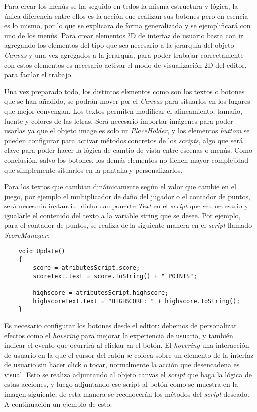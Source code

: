 Para crear los menús se ha seguido en todos la misma estructura y lógica, la única diferencia entre ellos es la acción que realizan sus botones pero en esencia es lo mismo, por lo que se explicara de forma generalizada y se ejemplificará con uno de los menús. Para crear elementos 2D de interfaz de usuario basta con ir agregando los elementos del tipo que sea necesario a la jerarquía del objeto \textit{Canvas} y una vez agregados a la jerarquía, para poder trabajar correctamente con estos elementos es necesario activar el modo de visualización 2D del editor, para facilar el trabajo. 

Una vez preparado todo, los distintos elementos como son los textos o botones que se han añadido, se podrán mover por el \textit{Canvas} para situarlos en los lugares que mejor convengan. Los textos permiten modificar el alineamiento, tamaño, fuente y colores de las letras. Será necesario importar imágenes para poder usarlas ya que el objeto image es solo un \textit{PlaceHolder}, y los elementos \textit{buttom} se pueden configurar para activar métodos concretos de los \textit{scripts}, algo que será clave para poder hacer la lógica de cambio de vista entre escenas o menús. Como conclusión, salvo los botones, los demás elementos no tienen mayor complejidad que simplemente situarlos en la pantalla y personalizarlos.

Para los textos que cambian dinámicamente según el valor que cambie en el juego, por ejemplo el multiplicador de daño del jugador o el contador de puntos, será necesario instanciar dicho componente \textit{Text} en el \textit{script} que sea necesario y igualarle el contenido del texto a la variable string que se desee. Por ejemplo, para el contador de puntos, se realiza de la siguiente manera en el \textit{script} llamado \textit{ScoreManager}:


\begin{lstlisting}
    void Update()
    {
        score = atributesScript.score;
        scoreText.text = score.ToString() + " POINTS";

        highscore = atributesScript.highscore;
        highscoreText.text = "HIGHSCORE: " + highscore.ToString();
    }
\end{lstlisting}

Es necesario configurar los botones desde el editor: debemos de personalizar efectos como el \textit{hovering} para mejorar la experiencia de usuario, y también indicar el evento que ocurrirá al clickar en el botón. El \textit{hovering} una interacción de usuario en la que el cursor del ratón se coloca sobre un elemento de la interfaz de usuario sin hacer click o tocar, normalmente la acción que desencadena es visual. Esto se realiza adjuntando al objeto canvas el \textit{script} que haga la lógica de estas acciones, y luego adjuntando ese script al botón como se muestra en la imagen siguiente, de esta manera se reconocerán los métodos del \textit{script} deseado. A continuación un ejemplo de esto:

